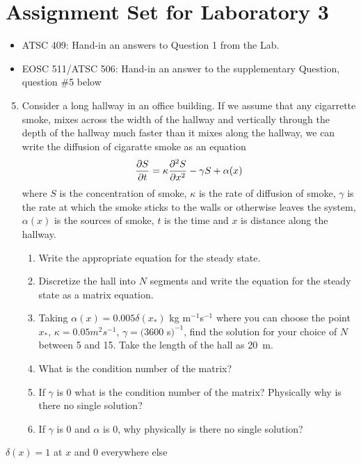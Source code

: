 \documentclass[12pt]{article}
\begin{document}
\section*{Assignment Set for Laboratory 3}

\begin{itemize}
\item ATSC 409: Hand-in an answers to Question 1 from the Lab.
  
\item EOSC 511/ATSC 506:  Hand-in an answer to the supplementary
  Question, question \#5 below
\end{itemize}

\begin{enumerate}
\setcounter{enumi}{4}
\item Consider a long hallway in an office building.  If we assume that any cigarrette smoke, mixes across the width of the hallway and vertically through the depth of the hallway much faster than it mixes along the hallway, we can write the diffusion of cigaratte smoke as an equation
\[
\frac{\partial S}{\partial t} = \kappa \frac {\partial^2 S}{\partial x^2} - \gamma S + \alpha(x)
\]
where $S$ is the concentration of smoke, $\kappa$ is the rate of diffusion of smoke, $\gamma$ is the rate at which the smoke sticks to the walls or otherwise leaves the system, $\alpha(x)$ is the sources of smoke, $t$ is the time and $x$ is distance along the hallway.
\begin{enumerate}
\item Write the appropriate equation for the steady state.
\item Discretize the hall into $N$ segments and write the equation for the steady state as a matrix equation.
\item Taking $\alpha(x) = 0.005 \delta(x_*)$ kg m$^{-1}$s$^{-1}$ where you can choose the point $x_*$, $\kappa = 0.05 m^2 s^{-1}$, $\gamma = (3600$ s$)^{-1}$, find the solution for your choice of $N$ between 5 and 15.  Take the length of the hall as 20~m.
\item What is the condition number of the matrix?
\item If $\gamma$ is 0 what is the condition number of the matrix?  Physically why is there no single solution?
\item If $\gamma$ is 0 and $\alpha$ is 0, why physically is there no single solution?
\end{enumerate}
\end{enumerate}

$\delta(x) = 1$ at $x$ and $0$ everywhere else
\end{document}
